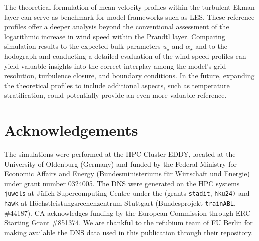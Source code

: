 \documentclass[smallcondensed,draft]{svjour3}
\begin{document}
The theoretical formulation of mean velocity profiles within the turbulent Ekman layer can serve as benchmark for model frameworks such as LES. These reference profiles offer a deeper analysis beyond the conventional assessment of the logarithmic increase in wind speed within the Prandtl layer. Comparing simulation results to the expected bulk parameters $u_\star$ and $\alpha_\star$ and to the hodograph and conducting a detailed evaluation of the wind speed profiles can yield valuable insights into the correct interplay among the model's grid resolution, turbulence closure, and boundary conditions. In the future, expanding the theoretical profiles to include additional aspects, such as temperature stratification, could potentially provide an even more valuable reference.

\section{Acknowledgements}

The simulations were performed at the HPC Cluster EDDY, located at the University of Oldenburg (Germany) and funded by the Federal Ministry for Economic Affairs and Energy (Bundesministeriums für Wirtschaft und Energie) under grant number 0324005. The DNS were generated on the HPC systems \texttt{juwels} at J\"ulich Supercomputing Centre under the (grants \texttt{stadit}, \texttt{hku24)} and \texttt{hawk} at H\"ochstleistungs\-rechen\-zentrum Stuttgart (Bundesprojekt \texttt{trainABL}, \#44187). CA acknowledges funding by the European Commission through ERC Starting Grant \#851374. We are thankful to the refubium team of FU Berlin for making available the DNS data used in this publication through their repository. 



\end{document}
